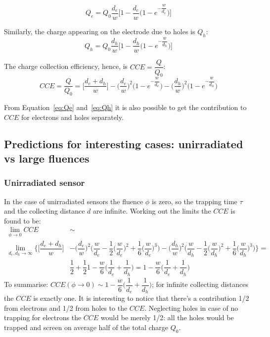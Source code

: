 \begin{equation}
Q_e=Q_0\dfrac{d_e}{w}\Big[1-\dfrac{d_e}{w}\Big(1-e^{-\dfrac{w}{d_e}}\Big)\Big]
\label{eq:Qe}
\end{equation}

Similarly, the charge appearing on the electrode due to holes is $Q_h$:
\begin{equation}
Q_h=Q_0\dfrac{d_h}{w}\Big[1-\dfrac{d_h}{w}\Big(1-e^{-\dfrac{w}{d_h}}\Big)\Big]
\label{eq:Qh}
\end{equation}

The charge collection efficiency, hence, is  $CCE=\dfrac{Q}{Q_0}$:
\begin{equation}
CCE=\dfrac{Q}{Q_0}=\Big[\dfrac{d_e+d_h}{w}\Big]-\Big(\dfrac{d_e}{w}\Big)^2\Big(1-e^{-\dfrac{w}{d_e}}\Big)-\Big(\dfrac{d_h}{w}\Big)^2\Big(1-e^{-\dfrac{w}{d_h}}\Big)
\end{equation}

From Equation~\ref{eq:Qe} and~\ref{eq:Qh} it is also possible to get the contribution to $CCE$ 
for electrons and holes separately. 

\subsection{Predictions for interesting cases: unirradiated vs large fluences}

\subsubsection{Unirradiated sensor}

In the case of unirradiated sensors the fluence $\phi$ is zero, so the trapping time $\tau$ and the 
collecting distance $d$ are infinite. Working out the limits the $CCE$ is found to be:
\begin{equation}
\begin{split}
\lim_{\phi \to 0}CCE & \sim \\ \lim_{d_e,d_h\to \infty}   \Big\{\Big[\dfrac{d_e+d_h}{w}\Big]&-\Big(\dfrac{d_e}{w}\Big)^2\Big(\dfrac{w}{d_e}-\dfrac{1}{2}\big(\dfrac{w}{d_e}\big)^2+\dfrac{1}{6}\big(\dfrac{w}{d_e}\big)^3\Big)-\Big(\dfrac{d_h}{w}\Big)^2\Big(\dfrac{w}{d_h}-\dfrac{1}{2}\big(\dfrac{w}{d_h}\big)^2+\dfrac{1}{6}\big(\dfrac{w}{d_h}\big)^3\Big)\Big\}=\\
&\dfrac{1}{2}+\dfrac{1}{2}1-\dfrac{w}{6}\Big(\dfrac{1}{d_e}+\dfrac{1}{d_h}\Big)=1-\dfrac{w}{6}\Big(\dfrac{1}{d_e}+\dfrac{1}{d_h}\Big)
\end{split}
\label{eq:CCE_unirr}
\end{equation}
To summarise: $CCE(\phi\to 0)\sim1-\dfrac{w}{6}\Big(\dfrac{1}{d_e}+\dfrac{1}{d_h}\Big)$; for infinite 
collecting distances the $CCE$ is exactly one. 
It is interesting to notice that there's a contribution 1/2 from electrons and 1/2 from holes to the 
$CCE$. Neglecting holes in case of no  trapping for electrons the $CCE$  would be merely 1/2: 
all the holes would be trapped and screen on average half of the total charge $Q_0$.

